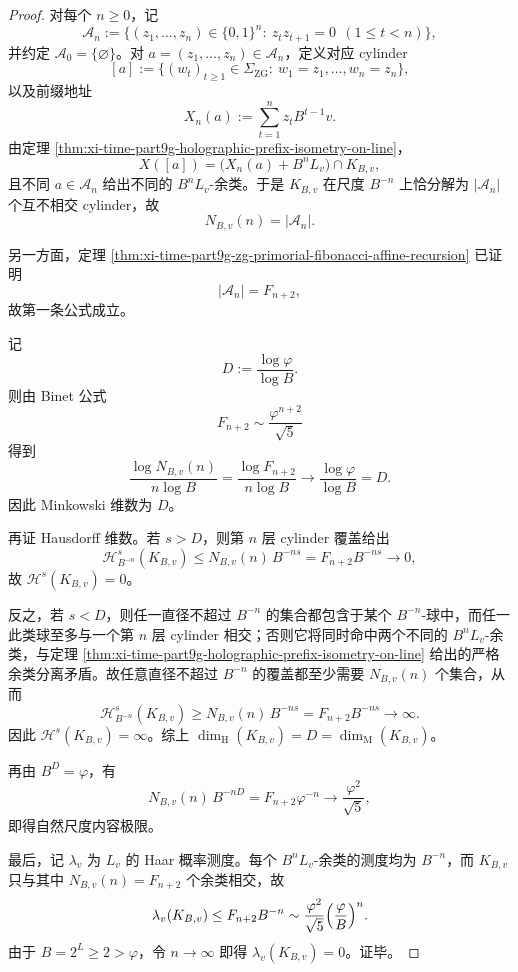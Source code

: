 \begin{proof}
对每个 \(n\ge 0\)，记
\[
\mathcal A_n
:=
\bigl\{
(z_1,\dots,z_n)\in\{0,1\}^n:\ z_tz_{t+1}=0\ \ (1\le t<n)
\bigr\},
\]
并约定 \(\mathcal A_0=\{\varnothing\}\)。对 \(a=(z_1,\dots,z_n)\in\mathcal A_n\)，定义对应 cylinder
\[
[a]
:=
\bigl\{
(w_t)_{t\ge 1}\in\Sigma_{\mathrm{ZG}}:\ w_1=z_1,\dots,w_n=z_n
\bigr\},
\]
以及前缀地址
\[
X_n(a):=\sum_{t=1}^{n}z_tB^{t-1}v.
\]
由定理 \ref{thm:xi-time-part9g-holographic-prefix-isometry-on-line}，
\[
X([a])=\bigl(X_n(a)+B^nL_v\bigr)\cap K_{B,v},
\]
且不同 \(a\in\mathcal A_n\) 给出不同的 \(B^nL_v\)-余类。于是 \(K_{B,v}\) 在尺度 \(B^{-n}\) 上恰分解为 \(|\mathcal A_n|\) 个互不相交 cylinder，故
\[
N_{B,v}(n)=|\mathcal A_n|.
\]

另一方面，定理 \ref{thm:xi-time-part9g-zg-primorial-fibonacci-affine-recursion} 已证明
\[
|\mathcal A_n|=F_{n+2},
\]
故第一条公式成立。

记
\[
D:=\frac{\log\varphi}{\log B}.
\]
则由 Binet 公式
\[
F_{n+2}\sim \frac{\varphi^{n+2}}{\sqrt5}
\]
得到
\[
\frac{\log N_{B,v}(n)}{n\log B}
=
\frac{\log F_{n+2}}{n\log B}
\longrightarrow
\frac{\log\varphi}{\log B}
=
D.
\]
因此 Minkowski 维数为 \(D\)。

再证 Hausdorff 维数。若 \(s>D\)，则第 \(n\) 层 cylinder 覆盖给出
\[
\mathcal H^s_{B^{-n}}(K_{B,v})
\le
N_{B,v}(n)\,B^{-ns}
=
F_{n+2}B^{-ns}
\to 0,
\]
故 \(\mathcal H^s(K_{B,v})=0\)。

反之，若 \(s<D\)，则任一直径不超过 \(B^{-n}\) 的集合都包含于某个 \(B^{-n}\)-球中，而任一此类球至多与一个第 \(n\) 层 cylinder 相交；否则它将同时命中两个不同的 \(B^nL_v\)-余类，与定理
\ref{thm:xi-time-part9g-holographic-prefix-isometry-on-line} 给出的严格余类分离矛盾。故任意直径不超过 \(B^{-n}\) 的覆盖都至少需要 \(N_{B,v}(n)\) 个集合，从而
\[
\mathcal H^s_{B^{-n}}(K_{B,v})
\ge
N_{B,v}(n)\,B^{-ns}
=
F_{n+2}B^{-ns}
\to \infty.
\]
因此 \(\mathcal H^s(K_{B,v})=\infty\)。综上 \(\dim_{\mathrm H}(K_{B,v})=D=\dim_{\mathrm M}(K_{B,v})\)。

再由 \(B^D=\varphi\)，有
\[
N_{B,v}(n)\,B^{-nD}
=
F_{n+2}\varphi^{-n}
\longrightarrow
\frac{\varphi^2}{\sqrt5},
\]
即得自然尺度内容极限。

最后，记 \(\lambda_v\) 为 \(L_v\) 的 Haar 概率测度。每个 \(B^nL_v\)-余类的测度均为 \(B^{-n}\)，而 \(K_{B,v}\) 只与其中 \(N_{B,v}(n)=F_{n+2}\) 个余类相交，故
\[
\lambda_v(K_{B,v})
\le
F_{n+2}B^{-n}
\sim
\frac{\varphi^2}{\sqrt5}\Bigl(\frac{\varphi}{B}\Bigr)^n.
\]
由于 \(B=2^L\ge 2>\varphi\)，令 \(n\to\infty\) 即得 \(\lambda_v(K_{B,v})=0\)。证毕。
\end{proof}


